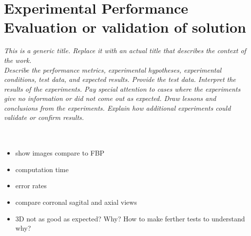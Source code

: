 \chapter{Experimental Performance Evaluation or validation of solution}
\textit{This is a generic title. Replace it with an actual title that describes the context of the work.\\
Describe the  performance metrics, experimental hypotheses,  experimental conditions, test data, and expected results.  Provide the test data.  Interpret the results of the experiments.  Pay special attention to cases where the experiments give no information or did not come out as expected.  Draw lessons and conclusions from the experiments. Explain how additional experiments could validate or confirm results.}\\
\\
\\
\begin{itemize}
	\item show images compare to FBP
	\item computation time
	\item error rates
	\item compare corronal sagital and axial views
	\item 3D not as good as expected? Why? How to make ferther tests to understand why?
\end{itemize}